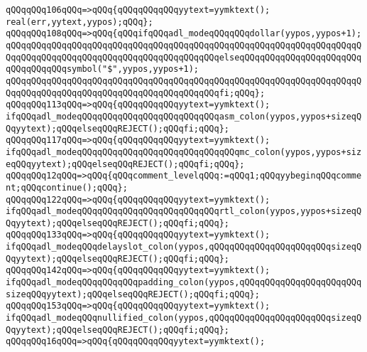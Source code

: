 \verb|qQQqqQQq106qQQq=>qQQq{qQQqqQQqqQQqyytext=yymktext();|\newline
\verb|real(err,yytext,yypos);qQQq};|\newline
\verb|qQQqqQQq108qQQq=>qQQq{qQQqifqQQqadl_modeqQQqqQQqdollar(yypos,yypos+1);|\newline
\verb|qQQqqQQqqQQqqQQqqQQqqQQqqQQqqQQqqQQqqQQqqQQqqQQqqQQqqQQqqQQqqQQqqQQqqQQqqQQqqQQqqQQqqQQqqQQqqQQqqQQqqQQqqQQqqQQqelseqQQqqQQqqQQqqQQqqQQqqQQqqQQqqQQqqQQqsymbol("$",yypos,yypos+1);|\newline
\verb|qQQqqQQqqQQqqQQqqQQqqQQqqQQqqQQqqQQqqQQqqQQqqQQqqQQqqQQqqQQqqQQqqQQqqQQqqQQqqQQqqQQqqQQqqQQqqQQqqQQqqQQqqQQqqQQqfi;qQQq};|\newline
\verb|qQQqqQQq113qQQq=>qQQq{qQQqqQQqqQQqyytext=yymktext();|\newline
\verb|ifqQQqadl_modeqQQqqQQqqQQqqQQqqQQqqQQqqQQqasm_colon(yypos,yypos+sizeqQQqyytext);qQQqelseqQQqREJECT();qQQqfi;qQQq};|\newline
\verb|qQQqqQQq117qQQq=>qQQq{qQQqqQQqqQQqyytext=yymktext();|\newline
\verb|ifqQQqadl_modeqQQqqQQqqQQqqQQqqQQqqQQqqQQqqQQqmc_colon(yypos,yypos+sizeqQQqyytext);qQQqelseqQQqREJECT();qQQqfi;qQQq};|\newline
\verb|qQQqqQQq12qQQq=>qQQq{qQQqcomment_levelqQQq:=qQQq1;qQQqyybeginqQQqcomment;qQQqcontinue();qQQq};|\newline
\verb|qQQqqQQq122qQQq=>qQQq{qQQqqQQqqQQqyytext=yymktext();|\newline
\verb|ifqQQqadl_modeqQQqqQQqqQQqqQQqqQQqqQQqqQQqrtl_colon(yypos,yypos+sizeqQQqyytext);qQQqelseqQQqREJECT();qQQqfi;qQQq};|\newline
\verb|qQQqqQQq133qQQq=>qQQq{qQQqqQQqqQQqyytext=yymktext();|\newline
\verb|ifqQQqadl_modeqQQqdelayslot_colon(yypos,qQQqqQQqqQQqqQQqqQQqqQQqsizeqQQqyytext);qQQqelseqQQqREJECT();qQQqfi;qQQq};|\newline
\verb|qQQqqQQq142qQQq=>qQQq{qQQqqQQqqQQqyytext=yymktext();|\newline
\verb|ifqQQqadl_modeqQQqqQQqqQQqpadding_colon(yypos,qQQqqQQqqQQqqQQqqQQqqQQqsizeqQQqyytext);qQQqelseqQQqREJECT();qQQqfi;qQQq};|\newline
\verb|qQQqqQQq153qQQq=>qQQq{qQQqqQQqqQQqyytext=yymktext();|\newline
\verb|ifqQQqadl_modeqQQqnullified_colon(yypos,qQQqqQQqqQQqqQQqqQQqqQQqsizeqQQqyytext);qQQqelseqQQqREJECT();qQQqfi;qQQq};|\newline
\verb|qQQqqQQq16qQQq=>qQQq{qQQqqQQqqQQqyytext=yymktext();|\newline

